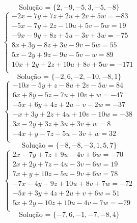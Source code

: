 \documentclass[12pt,oneside,a4paper]{article}
\begin{document}
\begin{equation*}
\text{Solução = }\{2,-9,-5,3,-5,-8\}
\end{equation*}
\vspace{\baselineskip}
\begin{equation*}
\begin{cases}
-2x-7y+7z+2u+2v+5w=-83 \\
-5x-7y+2z-10u+5v-5w=19 \\
-9x-9y+8z+5u-3v+3w=-75 \\
8x+3y-8z+3u-9v-5w=55 \\
5x-2y+9z-9u-5v-w=89 \\
10x+2y+2z+10u+8v+5w=-171 \\
\end{cases}
\end{equation*}
\begin{equation*}
\text{Solução = }\{-2,6,-2,-10,-8,1\}
\end{equation*}
\vspace{\baselineskip}
\begin{equation*}
\begin{cases}
-10x-5y+z-8u+2v-5w=84 \\
6x+8y-5z-7u+10v+w=-47 \\
-5x+6y+4z+2u-v-2w=-37 \\
-x+3y+2z+4u+10v-10w=-38 \\
3x-2y+3z+3u+3v+w=8 \\
-4x+y-7z-5u-3v+w=32 \\
\end{cases}
\end{equation*}
\begin{equation*}
\text{Solução = }\{-8,-8,-3,1,5,7\}
\end{equation*}
\vspace{\baselineskip}
\begin{equation*}
\begin{cases}
2x-7y+7z+9u-4v+6w=-70 \\
2x+2y+7z-4u-3v-6w=19 \\
7x+y+10z-5u-9v+6w=78 \\
-7x-4y-9z+10u+8v+7w=-72 \\
-5x+3y+4z+2u+v+6w=51 \\
5x+2y-10z+10u-4v-7w=-79 \\
\end{cases}
\end{equation*}
\begin{equation*}
\text{Solução = }\{-7,6,-1,-7,-8,4\}
\end{equation*}
\end{document}
